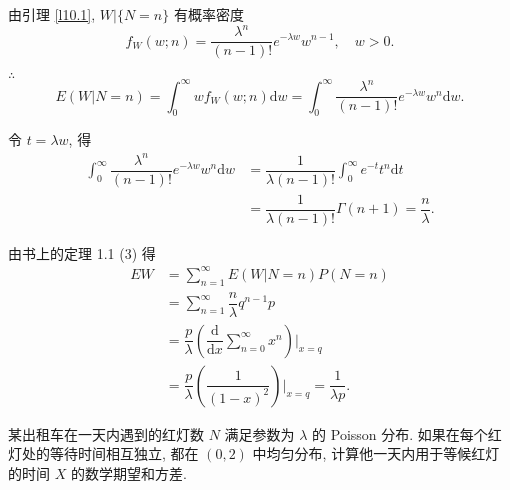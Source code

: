 \documentclass{ctexart}
\begin{document}
\begin{solution}
    由引理 \ref{l10.1}, $W|\{N=n\}$ 有概率密度
    \[f_W(w;n)=\dfrac{\lambda^n}{(n-1)!}e^{-\lambda w}w^{n-1},\quad w>0.\]

    $\therefore$
    \[E(W|N=n)=\int_0^\infty wf_W(w;n)\mathrm{d}w=\int_0^\infty\dfrac{\lambda^n}{(n-1)!}e^{-\lambda w}w^n\mathrm{d}w.\]

    令 $t=\lambda w$, 得
    \begin{align*}
        \int_0^\infty\dfrac{\lambda^n}{(n-1)!}e^{-\lambda w}w^n\mathrm{d}w & =\dfrac{1}{\lambda(n-1)!}\int_0^\infty e^{-t}t^n\mathrm{d}t \\
        & =\dfrac{1}{\lambda(n-1)!}\Gamma(n+1)=\dfrac{n}{\lambda}.
    \end{align*}

    由书上的定理 1.1 (3) 得
    \begin{align*}
        EW & =\sum\limits_{n=1}^\infty E(W|N=n)P(N=n) \\
        & =\sum\limits_{n=1}^\infty\dfrac{n}{\lambda}q^{n-1}p \\
        & =\dfrac{p}{\lambda}\left(\dfrac{\mathrm{d}}{\mathrm{d}x}\sum\limits_{n=0}^\infty x^n\right)\Bigg|_{x=q} \\
        & =\dfrac{p}{\lambda}\left(\dfrac{1}{(1-x)^2}\right)\Bigg|_{x=q}=\dfrac{1}{\lambda p}.
    \end{align*}
\end{solution}
\begin{exercise}%
    某出租车在一天内遇到的红灯数 $N$ 满足参数为 $\lambda$ 的 Poisson 分布. 如果在每个红灯处的等待时间相互独立, 都在 $(0,2)$ 中均匀分布, 计算他一天内用于等候红灯的时间 $X$ 的数学期望和方差.
\end{exercise}
\end{document}
